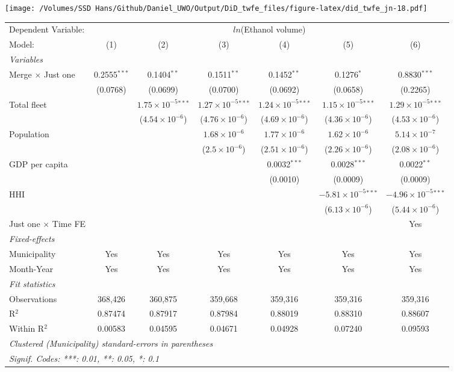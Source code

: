 \documentclass[
]{article}
\begin{document}
\texttt{[image: /Volumes/SSD Hans/Github/Daniel\_UWO/Output/DiD\_twfe\_files/figure-latex/did\_twfe\_jn-18.pdf]}

\begin{tabular}{lcccccc}
\tabularnewline\midrule\midrule
Dependent Variable:&\multicolumn{6}{c}{$ln$(Ethanol volume)}\\
Model:&(1) & (2) & (3) & (4) & (5) & (6)\\
\midrule \emph{Variables}&   &   &   &   &   &  \\
Merge $\times $ Just one & 0.2555$^{***}$ & 0.1404$^{**}$ & 0.1511$^{**}$ & 0.1452$^{**}$ & 0.1276$^{*}$ & 0.8830$^{***}$\\
  &(0.0768) & (0.0699) & (0.0700) & (0.0692) & (0.0658) & (0.2265)\\
Total fleet &    & $1.75\times 10^{-5}$$^{***}$ & $1.27\times 10^{-5}$$^{***}$ & $1.24\times 10^{-5}$$^{***}$ & $1.15\times 10^{-5}$$^{***}$ & $1.29\times 10^{-5}$$^{***}$\\
  &   & ($4.54\times 10^{-6}$) & ($4.76\times 10^{-6}$) & ($4.69\times 10^{-6}$) & ($4.36\times 10^{-6}$) & ($4.53\times 10^{-6}$)\\
Population &    &    & $1.68\times 10^{-6}$ & $1.77\times 10^{-6}$ & $1.62\times 10^{-6}$ & $5.14\times 10^{-7}$\\
  &   &    & ($2.5\times 10^{-6}$) & ($2.51\times 10^{-6}$) & ($2.26\times 10^{-6}$) & ($2.08\times 10^{-6}$)\\
GDP per capita &    &    &    & 0.0032$^{***}$ & 0.0028$^{***}$ & 0.0022$^{**}$\\
  &   &    &    & (0.0010) & (0.0009) & (0.0009)\\
HHI &    &    &    &    & $-5.81\times 10^{-5}$$^{***}$ & $-4.96\times 10^{-5}$$^{***}$\\
  &   &    &    &    & ($6.13\times 10^{-6}$) & ($5.44\times 10^{-6}$)\\
Just one $\times$ Time FE &  &  &  &  &  & Yes\\
\midrule \emph{Fixed-effects}&   &   &   &   &   &  \\
Municipality & Yes & Yes & Yes & Yes & Yes & Yes\\
Month-Year & Yes & Yes & Yes & Yes & Yes & Yes\\
\midrule \emph{Fit statistics}&  & & & & & \\
Observations & 368,426&360,875&359,668&359,316&359,316&359,316\\
R$^2$ & 0.87474&0.87917&0.87984&0.88019&0.88310&0.88607\\
Within R$^2$ & 0.00583&0.04595&0.04671&0.04928&0.07240&0.09593\\
\midrule\midrule\multicolumn{7}{l}{\emph{Clustered (Municipality) standard-errors in parentheses}}\\
\multicolumn{7}{l}{\emph{Signif. Codes: ***: 0.01, **: 0.05, *: 0.1}}\\
\end{tabular}
\end{document}
